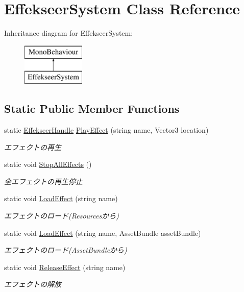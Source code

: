 \hypertarget{class_effekseer_system}{\section{Effekseer\-System Class Reference}
\label{class_effekseer_system}
}
Inheritance diagram for Effekseer\-System\-:\begin{figure}[H]
\begin{center}
\leavevmode
\includegraphics[height=2.000000cm]{class_effekseer_system}
\end{center}
\end{figure}
\subsection*{Static Public Member Functions}
\begin{DoxyCompactItemize}
\item 
static \hyperlink{struct_effekseer_handle}{Effekseer\-Handle} \hyperlink{class_effekseer_system_a8d0a7561a512b64acce39c4456ff6f37}{Play\-Effect} (string name, Vector3 location)
\begin{DoxyCompactList}\small\item\em エフェクトの再生 \end{DoxyCompactList}\item 
static void \hyperlink{class_effekseer_system_acf3dde4a65c0e99aeacfea71b517b541}{Stop\-All\-Effects} ()
\begin{DoxyCompactList}\small\item\em 全エフェクトの再生停止 \end{DoxyCompactList}\item 
static void \hyperlink{class_effekseer_system_af4059b796725905982565d8b239bf9fa}{Load\-Effect} (string name)
\begin{DoxyCompactList}\small\item\em エフェクトのロード(Resourcesから) \end{DoxyCompactList}\item 
static void \hyperlink{class_effekseer_system_a4f7d874f76c4f354b70b852df590be72}{Load\-Effect} (string name, Asset\-Bundle asset\-Bundle)
\begin{DoxyCompactList}\small\item\em エフェクトのロード(Asset\-Bundleから) \end{DoxyCompactList}\item 
static void \hyperlink{class_effekseer_system_a8b328c83692b922217657a21f9d5fdeb}{Release\-Effect} (string name)
\begin{DoxyCompactList}\small\item\em エフェクトの解放 \end{DoxyCompactList}\end{DoxyCompactItemize}
